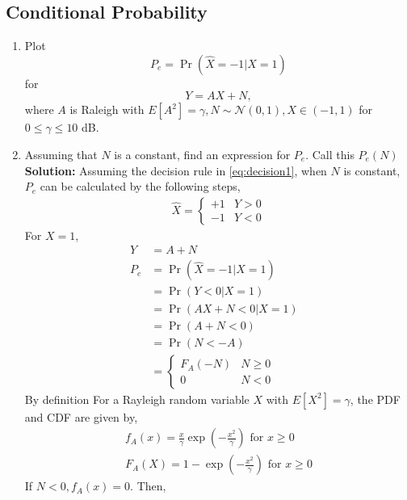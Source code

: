 \documentclass[journal,10pt,twocolumn]{IEEEtran}
\newcounter{Chapcounter}
\numberwithin{equation}{subsection}
\numberwithin{figure}{subsection}
\renewcommand\thesection{\theChapcounter.\arabic{section}}
\providecommand{\pr}[1]{\ensuremath{\Pr\left(#1\right)}}
\providecommand{\sbrak}[1]{\ensuremath{{}\left[#1\right]}}
\providecommand{\brak}[1]{\ensuremath{\left(#1\right)}}
\newcommand{\solution}{\noindent \textbf{Solution: }}
\providecommand{\gauss}[2]{\mathcal{N}\ensuremath{\left(#1,#2\right)}}
\renewcommand\thesection{\arabic{section}}
\renewcommand\thesubsection{\thesection.\arabic{subsection}}
\begin{document}
\subsection{\textbf{Conditional Probability}}
\begin{enumerate}[label=\thesubsection.\arabic*,ref=\thesubsection.\arabic{figure}]
\item
Plot 
\begin{equation}
\label{eq:ch4_1}
P_e = \pr{\hat{X} = -1|X=1}
\end{equation}
%
for 
\begin{equation}
Y = AX+N,
\end{equation}
where $A$ is Raleigh with $E\sbrak{A^2} = \gamma, N \sim \gauss{0}{1}, X \in \brak{-1,1}$ for $0 \le \gamma \le 10$ dB.
\item
Assuming that $N$ is a constant, find an expression for $P_e$.  Call this $P_e(N)$\\
\solution Assuming the decision rule in \eqref{eq:decision1}, when $N$ is constant, $P_e$ can be calculated by the following steps, 
\begin{align}
\hat{X} = 
\begin{cases}
+1 & Y>0\\
-1 & Y<0
\end{cases}
\end{align}
For $X = 1$, 
\begin{align}
Y &= A + N\\
P_e &= \pr{\hat{X} = -1|X=1} \\
&= \pr{Y<0 |X=1}\\
&= \pr{AX + N < 0|X=1}&\\ 
	\label{eq:prob_err_rayleigh_gen}
	&= \pr{A + N < 0}&\\
	&= \pr{N < -A}\\
	\label{eq:prob_err_bpsk_rayleigh_cdf}
	&=
	\begin{cases}
	F_A(-N) & N \ge 0\\
	0 & N < 0
	\end{cases}
\end{align}
By definition For a Rayleigh random variable $X$ with $E\sbrak{X^2} = \gamma$, the PDF and CDF are given by,
\begin{align}
\label{eq:rayleigh_pdf}
f_A(x) = 
\frac{x}{\gamma}\exp\brak{{-\frac{x^2}{\gamma}}} \text{ for } x \ge 0\\
\label{eq:rayleigh_cdf}
F_A(X) = 1-\exp\left(-\frac{x^2}{\gamma}\right) \text{ for } x \ge 0
\end{align}
If $N<0, f_A(x) = 0$. Then,

\end{enumerate}
\end{document}
